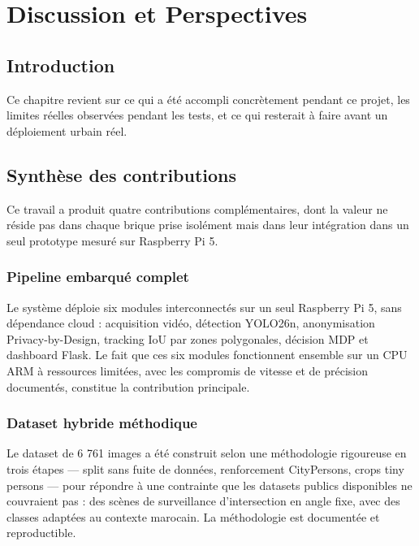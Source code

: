 \chapter{Discussion et Perspectives}
\label{ch:discussion_perspectives}

\section*{Introduction}
{}

Ce chapitre revient sur ce qui a été
accompli concrètement pendant ce projet,
les limites réelles observées pendant
les tests, et ce qui resterait à faire
avant un déploiement urbain réel.

\section{Synthèse des contributions}

Ce travail a produit quatre contributions
complémentaires, dont la valeur ne réside
pas dans chaque brique prise isolément
mais dans leur intégration dans un seul
prototype mesuré sur Raspberry Pi 5.

\subsection{Pipeline embarqué complet}

Le système déploie six modules
interconnectés sur un seul Raspberry
Pi 5, sans dépendance cloud : acquisition
vidéo, détection YOLO26n, anonymisation
Privacy-by-Design, tracking IoU par zones
polygonales, décision MDP et dashboard
Flask. Le fait que ces six modules
fonctionnent ensemble sur un CPU ARM à
ressources limitées, avec les compromis
de vitesse et de précision documentés,
constitue la contribution principale.

\subsection{Dataset hybride méthodique}

Le dataset de 6 761 images a été
construit selon une méthodologie
rigoureuse en trois étapes — split
sans fuite de données, renforcement
CityPersons, crops tiny persons —
pour répondre à une contrainte que
les datasets publics disponibles ne
couvraient pas : des scènes de
surveillance d'intersection en angle
fixe, avec des classes adaptées au
contexte marocain. La méthodologie
est documentée et reproductible.

